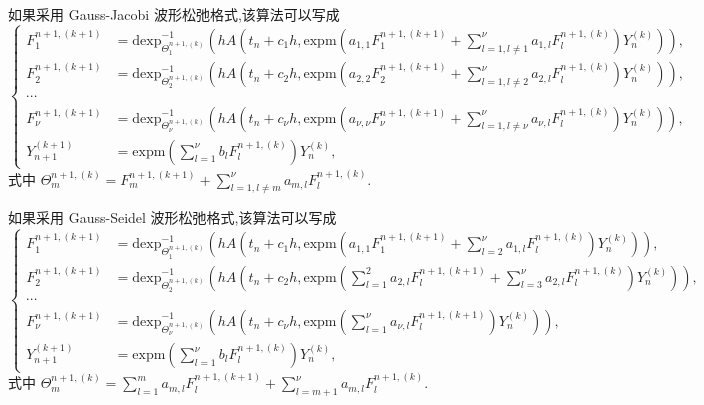 如果采用 Gauss-Jacobi 波形松弛格式,该算法可以写成
\begin{equation*}
	\left\lbrace\begin{aligned}
		F_1^{n+1,(k+1)}&=\mbox{dexp}_{\Theta_1^{n+1,(k)}}^{-1}(hA(t_n+c_1h,\mbox{expm}(a_{1,1}F_1^{n+1,(k+1)}+\sum_{l=1,l\neq 1}^{\nu}a_{1,l}F_l^{n+1,(k)})Y_n^{(k)})),\\
		F_2^{n+1,(k+1)}&=\mbox{dexp}_{\Theta_2^{n+1,(k)}}^{-1}(hA(t_n+c_2h,\mbox{expm}(a_{2,2}F_2^{n+1,(k+1)}+\sum_{l=1,l\neq 2}^{\nu}a_{2,l}F_l^{n+1,(k)})Y_n^{(k)})),\\
		\cdots \\
		F_{\nu}^{n+1,(k+1)}&=\mbox{dexp}_{\Theta_{\nu}^{n+1,(k)}}^{-1}(hA(t_n+c_{\nu}h,\mbox{expm}(a_{\nu,\nu}F_{\nu}^{n+1,(k+1)}+\sum_{l=1,l\neq \nu}^{\nu}a_{\nu,l}F_l^{n+1,(k)})Y_n^{(k)})),\\
		Y_{n+1}^{(k+1)}&=\mbox{expm}(\sum_{l=1}^{\nu}b_lF_l^{n+1,(k)})Y_n^{(k)},
	\end{aligned}\right.
\end{equation*}
式中 $\Theta_m^{n+1,(k)} = F_{m}^{n+1,(k+1)}+\sum_{l=1,l\neq m}^{\nu}a_{m,l}F_l^{n+1,(k)}$.

如果采用 Gauss-Seidel 波形松弛格式,该算法可以写成
\begin{equation*}
	\left\lbrace\begin{aligned}
		F_1^{n+1,(k+1)}&=\mbox{dexp}_{\Theta_1^{n+1,(k)}}^{-1}(hA(t_n+c_1h,\mbox{expm}(a_{1,1}F_1^{n+1,(k+1)}+\sum_{l=2}^{\nu}a_{1,l}F_l^{n+1,(k)})Y_n^{(k)})),\\
		F_2^{n+1,(k+1)}&=\mbox{dexp}_{\Theta_2^{n+1,(k)}}^{-1}(hA(t_n+c_2h,\mbox{expm}(\sum_{l=1}^{2}a_{2,l}F_l^{n+1,(k+1)}+\sum_{l=3}^{\nu}a_{2,l}F_l^{n+1,(k)})Y_n^{(k)})),\\
		\cdots \\
		F_{\nu}^{n+1,(k+1)}&=\mbox{dexp}_{\Theta_{\nu}^{n+1,(k)}}^{-1}(hA(t_n+c_{\nu}h,\mbox{expm}(\sum_{l=1}^{\nu}a_{\nu,l}F_{l}^{n+1,(k+1)})Y_n^{(k)})),\\
		Y_{n+1}^{(k+1)}&=\mbox{expm}(\sum_{l=1}^{\nu}b_lF_l^{n+1,(k)})Y_n^{(k)},
	\end{aligned}\right.
\end{equation*}
式中 $\Theta_m^{n+1,(k)} = \sum_{l=1}^{m}a_{m,l}F_{l}^{n+1,(k+1)}+\sum_{l=m+1}^{\nu}a_{m,l}F_l^{n+1,(k)}$.


